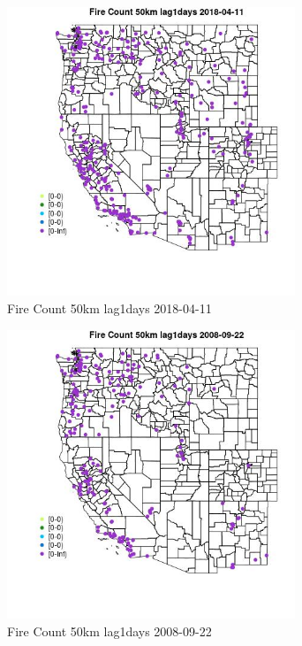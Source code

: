\begin{figure} 
\centering  
\includegraphics[width=0.77\textwidth]{Code_Outputs/Report_ML_input_PM25_Step4_part_e_de_duplicated_aves_compiled_2019-05-18wNAs_MapObsFire_Count_50km_lag1days2018-04-11.jpg} 
\caption{\label{fig:Report_ML_input_PM25_Step4_part_e_de_duplicated_aves_compiled_2019-05-18wNAsMapObsFire_Count_50km_lag1days2018-04-11}Fire Count 50km lag1days 2018-04-11} 
\end{figure} 
 

\begin{figure} 
\centering  
\includegraphics[width=0.77\textwidth]{Code_Outputs/Report_ML_input_PM25_Step4_part_e_de_duplicated_aves_compiled_2019-05-18wNAs_MapObsFire_Count_50km_lag1days2008-09-22.jpg} 
\caption{\label{fig:Report_ML_input_PM25_Step4_part_e_de_duplicated_aves_compiled_2019-05-18wNAsMapObsFire_Count_50km_lag1days2008-09-22}Fire Count 50km lag1days 2008-09-22} 
\end{figure} 
 

